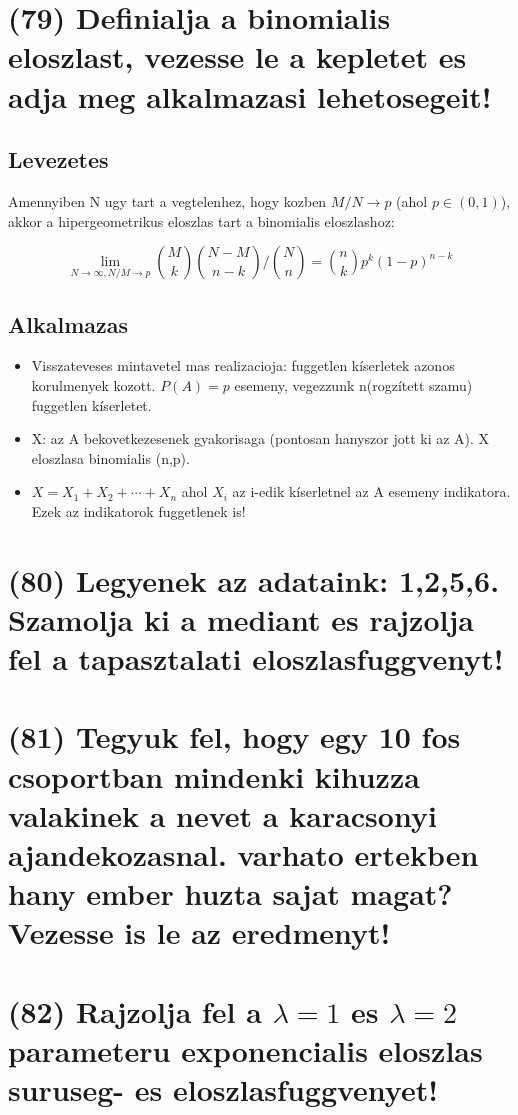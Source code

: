 \documentclass[12p]{article}
\begin{document}
\section{(79) Definialja a binomialis eloszlast, vezesse le a kepletet es adja meg alkalmazasi lehetosegeit!}

\subsection{Levezetes}

Amennyiben N ugy tart a vegtelenhez, hogy kozben $M/N \rightarrow p$ (ahol $p \in (0,1)$), akkor a hipergeometrikus eloszlas tart a binomialis eloszlashoz:

$$\lim_{N \rightarrow \infty, N/M \rightarrow p} {M \choose k}{{N - M} \choose {n - k}}/{N \choose n} = {n \choose k}p^k(1-p)^{n-k}$$

\subsection{Alkalmazas}
\begin{itemize}
\item Visszateveses mintavetel mas realizacioja: fuggetlen kíserletek azonos korulmenyek kozott. $P(A) = p$ esemeny, vegezzunk n(rogzített szamu) fuggetlen kíserletet.
\item X: az A bekovetkezesenek gyakorisaga (pontosan hanyszor jott ki az A). X eloszlasa binomialis (n,p).
\item $X = X_1 + X_2 + \cdots + X_n$ ahol $X_i$ az i-edik kíserletnel az A esemeny indikatora. Ezek az indikatorok fuggetlenek is!

\end{itemize}

\section{(80) Legyenek az adataink: 1,2,5,6. Szamolja ki a mediant es rajzolja fel a tapasztalati eloszlasfuggvenyt!}

\section{(81) Tegyuk fel, hogy egy 10 fos csoportban mindenki kihuzza valakinek a nevet a karacsonyi ajandekozasnal. varhato ertekben hany ember huzta sajat magat? Vezesse is le az eredmenyt!}

\section{(82) Rajzolja fel a $\lambda = 1$ es $\lambda = 2$ parameteru exponencialis eloszlas suruseg- es eloszlasfuggvenyet!}
\end{document}
